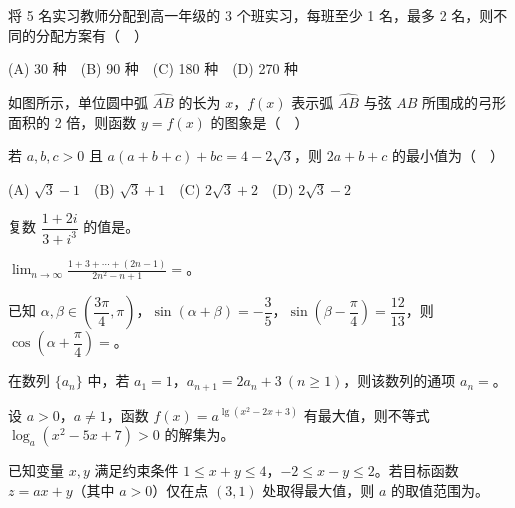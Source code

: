 \begin{question}
将 5 名实习教师分配到高一年级的 3 个班实习，每班至少 1 名，最多 2 名，则不同的分配方案有（　）

(A) 30 种　(B) 90 种　(C) 180 种　(D) 270 种

\Needspace{0.4\textheight}
\end{question}
\begin{question}
如图所示，单位圆中弧 \(\widehat{AB}\) 的长为 \(x\)，\(f(x)\) 表示弧 \(\widehat{AB}\) 与弦 \(AB\) 所围成的弓形面积的 2 倍，则函数 \(y=f(x)\) 的图象是（　）
\nopagebreak[4]
\begin{center}\end{center}
\nopagebreak[4]
\end{question}
\begin{question}
若 \(a,b,c>0\) 且 \(a(a+b+c)+bc=4-2\sqrt3\)，则 \(2a+b+c\) 的最小值为（　）

(A) \(\sqrt3-1\)　(B) \(\sqrt3+1\)　(C) \(2\sqrt3+2\)　(D) \(2\sqrt3-2\)

\end{question}

\begin{question}
复数 \(\dfrac{1+2i}{3+i^3}\) 的值是\gkblank{}。

\end{question}
\begin{question}
\(\displaystyle\lim_{n\to\infty}\frac{1+3+\cdots +(2n-1)}{2n^2-n+1}=\)\gkblank{}。

\end{question}
\begin{question}
已知 \(\alpha,\beta\in\left(\dfrac{3\pi}{4},\pi\right)\)，\(\sin(\alpha+\beta)=-\dfrac35\)，\(\sin\left(\beta-\dfrac\pi4\right)=\dfrac{12}{13}\)，则 \(\cos\left(\alpha+\dfrac\pi4\right)=\)\gkblank{}。

\end{question}
\begin{question}
在数列 \(\{a_n\}\) 中，若 \(a_1=1\)，\(a_{n+1}=2a_n+3\ (n\geq1)\)，则该数列的通项 \(a_n=\)\gkblank{}。

\end{question}
\begin{question}
设 \(a>0\)，\(a\ne1\)，函数 \(f(x)=a^{\lg(x^2-2x+3)}\) 有最大值，则不等式 \(\log_a(x^2-5x+7)>0\) 的解集为\gkblank{}。

\end{question}
\begin{question}
已知变量 \(x,y\) 满足约束条件 \(1\leq x+y\leq4\)，\(-2\leq x-y\leq2\)。若目标函数 \(z=ax+y\)（其中 \(a>0\)）仅在点 \((3,1)\) 处取得最大值，则 \(a\) 的取值范围为\gkblank{}。

\end{question}

